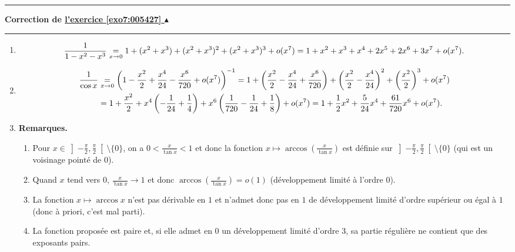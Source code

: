 \documentclass[11pt,a4paper]{article}
\newcommand{\Arccos}{\mathop{\mathrm{arccos}}\nolimits}
\newcounter{exo}
\newcommand{\correction}[1]{\hypertarget{cor7:#1}{}\label{cor7:#1}{\bf Correction de \hyperlink{exo7:#1}{l'exercice \ref{exo7:#1} $\blacktriangle$}}\vspace{1mm}\hrule\vspace{1mm}}
\newcommand{\fincorrection}{\vspace{1mm}\hrule\vspace*{7mm}}
\begin{document}
\begin{enumerate}
\begin{center}
\end{center}
\end{enumerate}
\fincorrection
\correction{005427}
\begin{enumerate}
 \item 
\begin{align*}\ensuremath 
\frac{1}{1-x^2-x^3}\underset{x\rightarrow0}{=}1+(x^2+x^3)+(x^2+x^3)^2+(x^2+x^3)^3+o(x^7)= 1+x^2+x^3+x^4+2x^5+2x^6+3x^7+o(x^7).
\end{align*}

\begin{center}
\end{center}
 \item 

\begin{align*}\ensuremath
\frac{1}{\cos x}&\underset{x\rightarrow0}{=}\left(1-\frac{x^2}{2}+\frac{x^4}{24}-\frac{x^6}{720}+o(x^7)\right)^{-1}
=1+\left(\frac{x^2}{2}-\frac{x^4}{24}+\frac{x^6}{720}\right)+\left(\frac{x^2}{2}-\frac{x^4}{24}\right)^2+\left(\frac{x^2}{2}\right)^3+o(x^7)\\
 &=1+\frac{x^2}{2}+x^4\left(-\frac{1}{24}+\frac{1}{4}\right)+x^6\left(\frac{1}{720}-\frac{1}{24}+\frac{1}{8}\right)+o(x^7)
=1+\frac{1}{2}x^2+\frac{5}{24}x^4+\frac{61}{720}x^6+o(x^7).
\end{align*}

\begin{center}
\end{center}
 \item  \textbf{Remarques.}

  \begin{enumerate}
  \item Pour $x\in\left]-\frac{\pi}{2},\frac{\pi}{2}\right[\setminus\{0\}$, on a $0<\frac{x}{\tan x}<1$ et donc la fonction $x\mapsto\Arccos\left(\frac{x}{\tan x}\right)$ est définie sur $\left]-\frac{\pi}{2},\frac{\pi}{2}\right[\setminus\{0\}$ (qui est un voisinage pointé de $0$).\rule[-2mm]{0mm}{6mm}
  \item Quand $x$ tend vers $0$, $\frac{x}{\tan x}\rightarrow1$ et donc $\Arccos\left(\frac{x}{\tan x}\right)=o(1)$ (développement limité à l'ordre $0$).
  \item La fonction $x\mapsto\Arccos x$ n'est pas dérivable en $1$ et n'admet donc pas en $1$ de développement limité d'ordre supérieur ou égal à $1$ (donc à priori, c'est mal parti).
  \item La fonction proposée est paire et, si elle admet en $0$ un développement limité d'ordre $3$, sa partie régulière ne contient que des exposants pairs.


\end{enumerate}
\end{enumerate}
\end{document}
